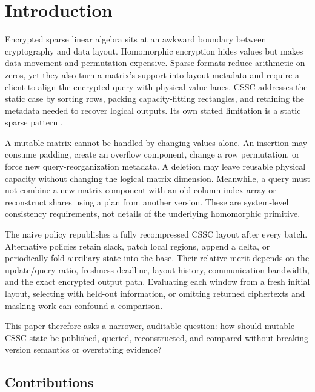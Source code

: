 \section{Introduction}\label{introduction}

Encrypted sparse linear algebra sits at an awkward boundary between cryptography and data layout. Homomorphic encryption hides values but makes data movement and permutation expensive. Sparse formats reduce arithmetic on zeros, yet they also turn a matrix's support into layout metadata and require a client to align the encrypted query with physical value lanes. CSSC addresses the static case by sorting rows, packing capacity-fitting rectangles, and retaining the metadata needed to recover logical outputs. Its own stated limitation is a static sparse pattern \cite{gao2026cssc}.

A mutable matrix cannot be handled by changing values alone. An insertion may consume padding, create an overflow component, change a row permutation, or force new query-reorganization metadata. A deletion may leave reusable physical capacity without changing the logical matrix dimension. Meanwhile, a query must not combine a new matrix component with an old column-index array or reconstruct shares using a plan from another version. These are system-level consistency requirements, not details of the underlying homomorphic primitive.

The naive policy republishes a fully recompressed CSSC layout after every batch. Alternative policies retain slack, patch local regions, append a delta, or periodically fold auxiliary state into the base. Their relative merit depends on the update/query ratio, freshness deadline, layout history, communication bandwidth, and the exact encrypted output path. Evaluating each window from a fresh initial layout, selecting with held-out information, or omitting returned ciphertexts and masking work can confound a comparison.

This paper therefore asks a narrower, auditable question: how should mutable CSSC state be published, queried, reconstructed, and compared without breaking version semantics or overstating evidence?

\subsection{Contributions}\label{contributions}

